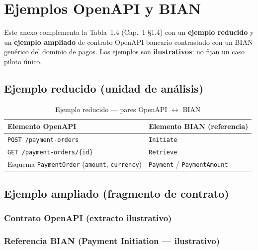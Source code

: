 \chapter{Ejemplos OpenAPI y BIAN}
\label{anexo:f}

Este anexo complementa la Tabla~1.4 (Cap.~1 §1.4) con un \textbf{ejemplo reducido} y un
\textbf{ejemplo ampliado} de contrato OpenAPI bancario contrastado con un \ServiceDomain{} BIAN
genérico del dominio de pagos. Los ejemplos son \textbf{ilustrativos}: no fijan un caso piloto
único.

\section{Ejemplo reducido (unidad de análisis)}

\begin{table}[H]
  \centering
  \caption{Ejemplo reducido — pares OpenAPI $\leftrightarrow$ BIAN}
  \label{tab:anexo-f-reducido}
  \small
  \begin{tabular}{@{}p{}p{}@{}}
    \toprule
    \textbf{Elemento OpenAPI} & \textbf{Elemento BIAN (referencia)} \\
    \midrule
    \texttt{POST /payment-orders} & \Behavior{} \texttt{Initiate} \\
    \texttt{GET /payment-orders/\{id\}} & \Behavior{} \texttt{Retrieve} \\
    Esquema \texttt{PaymentOrder} (\texttt{amount}, \texttt{currency}) &
    \BusinessObject{} \texttt{Payment} / \texttt{PaymentAmount} \\
    \bottomrule
  \end{tabular}
\end{table}

\section{Ejemplo ampliado (fragmento de contrato)}

\subsection{Contrato OpenAPI (extracto ilustrativo)}



\subsection{Referencia BIAN (Payment Initiation — ilustrativo)}

